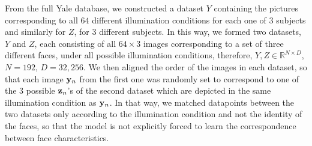 %
%
%
From the full Yale database, we constructed a dataset $Y$ containing the pictures corresponding to all $64$ different illumination conditions for each one of $3$
subjects and
similarly for $Z$, for $3$ different subjects.
  In this way, we formed two datasets, $Y$ and $Z$,
each consisting of all $64 \times 3$ images corresponding to a set of
three different faces, under all possible illumination conditions, therefore, $Y, Z \in \mathbb{R}^{N \times D}$,
$N = 192$, $D = 32,256$.
 We then aligned the order of the images in each dataset, so that each
image $\mathbf{y}_n$ from the first one was randomly set to correspond to one of
the $3$ possible $\mathbf{z}_n$'s of the second dataset which are depicted in the same
illumination condition as $\mathbf{y}_n$.
In that way, we matched datapoints between the two datasets only according to the 
illumination condition and not the identity of the faces, so that
the model is not explicitly forced to learn the correspondence between face characteristics.

